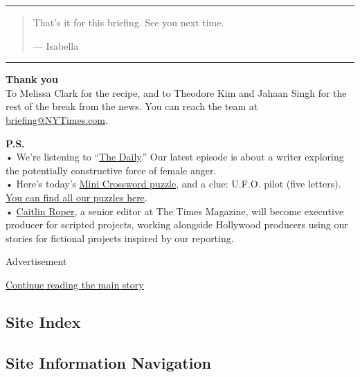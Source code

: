 \begin{center}\rule{0.5\linewidth}{\linethickness}\end{center}

\begin{quote}
That's it for this briefing. See you next time.

--- Isabella
\end{quote}

\begin{center}\rule{0.5\linewidth}{\linethickness}\end{center}

\textbf{Thank you}\\
To Melissa Clark for the recipe, and to Theodore Kim and Jahaan Singh
for the rest of the break from the news. You can reach the team at
\href{mailto:briefing+midnight@NYTimes.com?subject=Briefing\%20Feedback}{briefing@NYTimes.com}.

\textbf{P.S.}\\
• We're listening to
``\href{https://www.nytimes3xbfgragh.onion/thedaily}{The Daily}.'' Our
latest episode is about a writer exploring the potentially constructive
force of female anger.\\
• Here's today's
\href{https://www.nytimes3xbfgragh.onion/crosswords/game/mini}{Mini
Crossword puzzle}, and a clue: U.F.O. pilot (five letters).
\href{https://www.nytimes3xbfgragh.onion/crosswords}{You can find all
our puzzles here}.\\
•
\href{https://www.nytco.com/press/caitlin-roper-named-executive-producer-for-scripted-projects/}{Caitlin
Roper}, a senior editor at The Times Magazine, will become executive
producer for scripted projects, working alongside Hollywood producers
using our stories for fictional projects inspired by our reporting.

Advertisement

\protect\hyperlink{after-bottom}{Continue reading the main story}

\hypertarget{site-index}{%
\subsection{Site Index}\label{site-index}}

\hypertarget{site-information-navigation}{%
\subsection{Site Information
Navigation}\label{site-information-navigation}}

